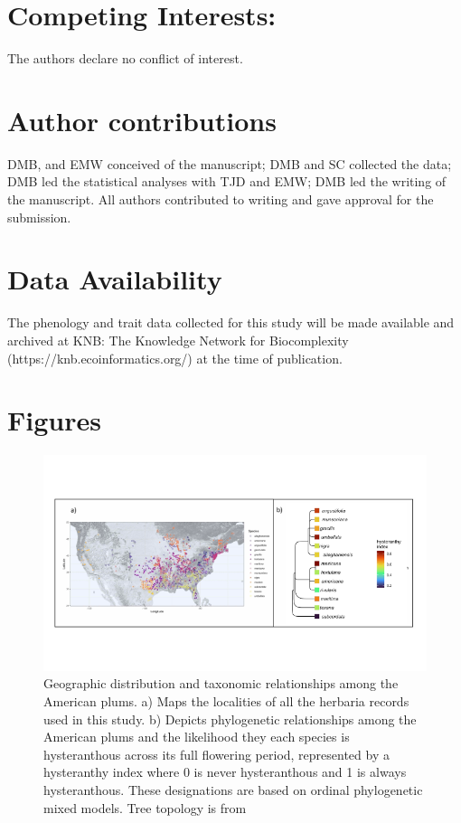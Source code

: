 \documentclass{article}[12pt]
\begin{document}
{\section*{Competing Interests:}
The authors declare no conflict of interest.

\section*{Author contributions}
DMB, and EMW conceived of the manuscript; DMB and SC collected the data; DMB led the statistical analyses with TJD and EMW; DMB led the writing of the manuscript. All authors contributed to writing and gave approval for the submission.

\section*{Data Availability}
The phenology and trait data collected for this study will be made available and archived at KNB: The Knowledge Network for Biocomplexity (https://knb.ecoinformatics.org/) at the time of publication.

 

\newpage
\section*{Figures}


\begin{figure}[h!]
  \centering
 \includegraphics[width=\textwidth]{..//..//Plots/fig1_new.png}
    \caption{Geographic distribution and taxonomic relationships among the American plums. a) Maps the localities of all the herbaria records used in this study. b) Depicts phylogenetic relationships among the American plums and the likelihood they each species is hysteranthous across its full flowering period, represented by a hysteranthy index where 0 is never hysteranthous and 1 is always hysteranthous. These designations are based on ordinal phylogenetic mixed models. Tree topology is from \citet{Shaw:2004aa}}
    \label{fig:phylo2}
\end{figure}



}
\end{document}
